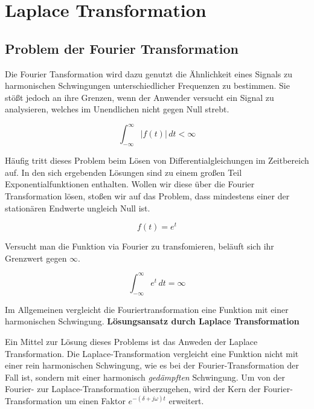 \section{Laplace Transformation}
\subsection{Problem der Fourier Transformation}

Die Fourier Tansformation wird dazu genutzt die Ähnlichkeit eines Signals zu harmonischen Schwingungen unterschiedlicher Frequenzen zu bestimmen. Sie stößt jedoch an ihre Grenzen, wenn der Anwender versucht ein Signal zu analysieren, welches im Unendlichen nicht gegen Null strebt.

\begin{equation}
    \int_{-\infty}^{\infty} |f(t)| \, dt < \infty
    \label{eq:abs_integrierbarkeit}
    \end{equation}

Häufig tritt dieses Problem beim Lösen von Differentialgleichungen im Zeitbereich auf. 
In den sich ergebenden Lösungen sind zu einem großen Teil Exponentialfunktionen enthalten. 
Wollen wir diese über die Fourier Transformation lösen, stoßen wir auf das Problem, dass mindestens einer der stationären Endwerte ungleich Null ist.

\begin{equation}
    f(t) = e^t
    \label{eq:exp_funktion}
    \end{equation}

Versucht man die Funktion via Fourier zu transfomieren, beläuft sich ihr Grenzwert gegen 
$\infty$. 

\begin{equation}
    \int_{-\infty}^{\infty} e^t \, dt = \infty
    \label{eq:exp_function_infty}
    \end{equation}
    
    \cite[S.~878]{buch1}

Im Allgemeinen vergleicht die Fouriertransformation eine Funktion mit einer harmonischen Schwingung. 
\addvspace{1cm}
\textbf{Lösungsansatz durch Laplace Transformation}

Ein Mittel zur Lösung dieses Problems ist das Anweden der Laplace Transformation. 
Die Laplace-Transformation vergleicht eine Funktion nicht mit einer rein harmonischen Schwingung, wie es bei der Fourier-Transformation der Fall ist, sondern mit einer harmonisch \emph{gedämpften} Schwingung. Um von der Fourier- zur Laplace-Transformation überzugehen, wird der Kern der Fourier-Transformation um einen Faktor \( e^{-(\delta + j\omega)t} \) erweitert. 

